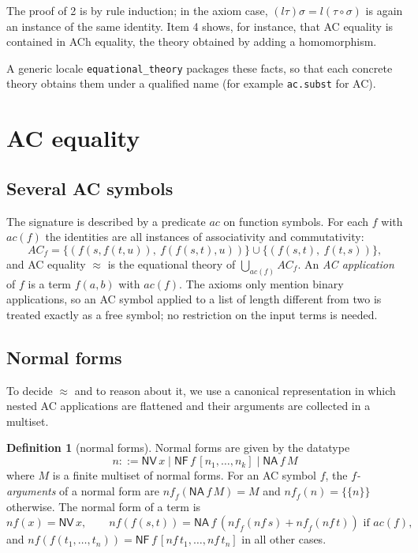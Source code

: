 \documentclass[11pt,a4paper]{article}
\theoremstyle{definition}
\newtheorem{definition}[theorem]{Definition}
\theoremstyle{remark}
\newcommand{\isa}[1]{\mbox{\small\texttt{#1}}}
\newcommand{\eqAC}{\approx}
\newcommand{\nf}{\mathit{nf}}
\newcommand{\mset}[1]{\{\!\{#1\}\!\}}
\begin{document}
The proof of 2 is by rule induction; in the axiom case, $(l\tau)\sigma = l(\tau\circ\sigma)$
is again an instance of the same identity. Item 4 shows, for instance, that AC equality is
contained in ACh equality, the theory obtained by adding a homomorphism.

A generic locale \isa{equational\_theory} packages these facts, so that each concrete theory
obtains them under a qualified name (for example \isa{ac.subst} for AC).

\section{AC equality}\label{sec:ac}

\subsection{Several AC symbols}

The signature is described by a predicate $\mathit{ac}$ on function symbols. For each $f$ with
$\mathit{ac}(f)$ the identities are all instances of associativity and commutativity:
\[
  \mathit{AC}_f = \{ (f(s, f(t, u)),\ f(f(s, t), u)) \} \cup \{ (f(s, t),\ f(t, s)) \},
\]
and AC equality $\eqAC$ is the equational theory of $\bigcup_{\mathit{ac}(f)} \mathit{AC}_f$.
An \emph{AC application} of $f$ is a term $f(a, b)$ with $\mathit{ac}(f)$. The axioms only
mention binary applications, so an AC symbol applied to a list of length different from two is
treated exactly as a free symbol; no restriction on the input terms is needed.

\subsection{Normal forms}

To decide $\eqAC$ and to reason about it, we use a canonical representation in which nested
AC applications are flattened and their arguments are collected in a multiset.

\begin{definition}[normal forms]
  Normal forms are given by the datatype
  \[
    n ::= \mathsf{NV}\,x \mid \mathsf{NF}\,f\,[n_1,\dots,n_k] \mid \mathsf{NA}\,f\,M
  \]
  where $M$ is a finite multiset of normal forms. For an AC symbol $f$, the \emph{$f$-arguments}
  of a normal form are $\nf_f(\mathsf{NA}\,f\,M) = M$ and $\nf_f(n) = \mset{n}$ otherwise. The
  normal form of a term is
  \[
    \nf(x) = \mathsf{NV}\,x, \qquad
    \nf(f(s,t)) = \mathsf{NA}\,f\,(\nf_f(\nf\,s) + \nf_f(\nf\,t)) \text{ if } \mathit{ac}(f),
  \]
  and $\nf(f(t_1,\dots,t_n)) = \mathsf{NF}\,f\,[\nf\,t_1,\dots,\nf\,t_n]$ in all other cases.
\end{definition}
\end{document}
